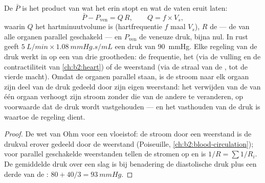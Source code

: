 \begin{theorem}\label{thm:b2:blood-pressure:equation}
De  $\bar P$ is het product van wat het  erin
stopt en wat de vaten eruit laten:
\[
\bar P - P_{\text{ven}} = Q\,R, \qquad Q = f\times V_s,
\]
waarin $Q$ het hartminuutvolume is (hartfrequentie $f$ maal 
$V_s$), $R$ de  --- de  van alle organen
parallel geschakeld --- en $P_{\text{ven}}$ de veneuze druk, bijna nul. In
rust geeft $\qty{5}{L/min}\times\qty{1.08}{mmHg.s/mL}$ een druk van
\qty{90}{mmHg}. Elke regeling van de druk werkt in op een van drie
grootheden: de frequentie, het  (via de vulling en de
contractiliteit van \cref{ch:b2:heart}) of de weerstand (via de straal van
de , tot de vierde macht). Omdat de organen parallel staan, is de
stroom naar elk orgaan zijn deel van de druk gedeeld door zijn eigen
weerstand: het verwijden van de  van één orgaan verhoogt zijn
stroom zonder die van de andere te veranderen, op voorwaarde dat de druk
wordt vastgehouden --- en het vasthouden van de druk is waartoe de regeling
dient.
\end{theorem}
\begin{proof}
De wet van Ohm voor een vloeistof: de stroom door een weerstand is de drukval
erover gedeeld door de weerstand (Poiseuille,
\cref{ch:b2:blood-circulation}); voor parallel geschakelde weerstanden tellen
de stromen op en is $1/R = \sum 1/R_i$. De gemiddelde druk over een slag is
bij benadering de diastolische druk plus een derde van de :
$80 + 40/3 = \qty{93}{mmHg}$.
\end{proof}

